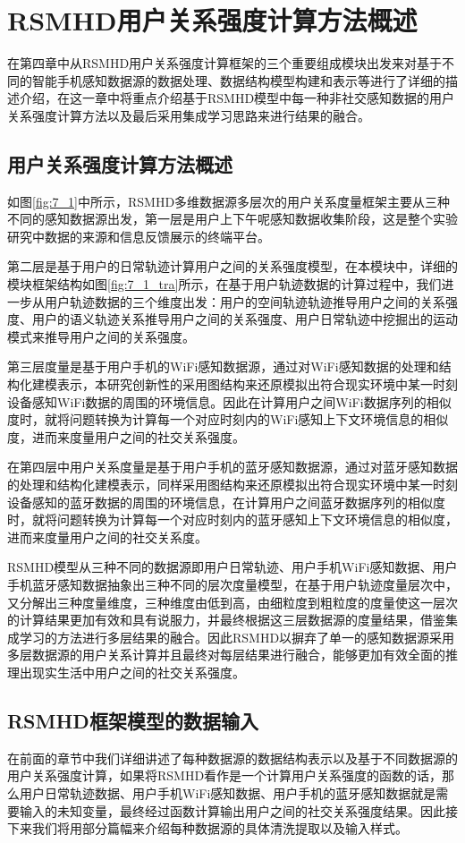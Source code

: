 \chapter{RSMHD用户关系强度计算方法概述}
\label{chap:chapter04}
在第四章中从RSMHD用户关系强度计算框架的三个重要组成模块出发来对基于不同的智能手机感知数据源的数据处理、数据结构模型构建和表示等进行了详细的描述介绍，在这一章中将重点介绍基于RSMHD模型中每一种非社交感知数据的用户关系强度计算方法以及最后采用集成学习思路来进行结果的融合。
\section{用户关系强度计算方法概述}
\label{sec:section4-1}
如图\ref{fig:7_1}中所示，RSMHD多维数据源多层次的用户关系度量框架主要从三种不同的感知数据源出发，第一层是用户上下午呢感知数据收集阶段，这是整个实验研究中数据的来源和信息反馈展示的终端平台。
\par 第二层是基于用户的日常轨迹计算用户之间的关系强度模型，在本模块中，详细的模块框架结构如图\ref{fig:7_1_tra}所示，在基于用户轨迹数据的计算过程中，我们进一步从用户轨迹数据的三个维度出发：用户的空间轨迹轨迹推导用户之间的关系强度、用户的语义轨迹关系推导用户之间的关系强度、用户日常轨迹中挖掘出的运动模式来推导用户之间的关系强度。
\par 第三层度量是基于用户手机的WiFi感知数据源，通过对WiFi感知数据的处理和结构化建模表示，本研究创新性的采用图结构来还原模拟出符合现实环境中某一时刻设备感知WiFi数据的周围的环境信息。因此在计算用户之间WiFi数据序列的相似度时，就将问题转换为计算每一个对应时刻内的WiFi感知上下文环境信息的相似度，进而来度量用户之间的社交关系强度。
\par 在第四层中用户关系度量是基于用户手机的蓝牙感知数据源，通过对蓝牙感知数据的处理和结构化建模表示，同样采用图结构来还原模拟出符合现实环境中某一时刻设备感知的蓝牙数据的周围的环境信息，在计算用户之间蓝牙数据序列的相似度时，就将问题转换为计算每一个对应时刻内的蓝牙感知上下文环境信息的相似度，进而来度量用户之间的社交关系度。
\par RSMHD模型从三种不同的数据源即用户日常轨迹、用户手机WiFi感知数据、用户手机蓝牙感知数据抽象出三种不同的层次度量模型，在基于用户轨迹度量层次中，又分解出三种度量维度，三种维度由低到高，由细粒度到粗粒度的度量使这一层次的计算结果更加有效和具有说服力，并最终根据这三层数据源的度量结果，借鉴集成学习的方法进行多层结果的融合。因此RSMHD以摒弃了单一的感知数据源采用多层数据源的用户关系计算并且最终对每层结果进行融合，能够更加有效全面的推理出现实生活中用户之间的社交关系强度。
\section{RSMHD框架模型的数据输入}
\label{sec:section4-2}
在前面的章节中我们详细讲述了每种数据源的数据结构表示以及基于不同数据源的用户关系强度计算，如果将RSMHD看作是一个计算用户关系强度的函数的话，那么用户日常轨迹数据、用户手机WiFi感知数据、用户手机的蓝牙感知数据就是需要输入的未知变量，最终经过函数计算输出用户之间的社交关系强度结果。因此接下来我们将用部分篇幅来介绍每种数据源的具体清洗提取以及输入样式。
